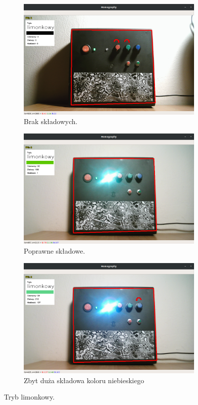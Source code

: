 \documentclass[12pt,twoside,polish]{article}
\begin{document}
\begin{figure}[]
	\begin{subfigure}[b]{0.5\textwidth}
		\includegraphics[width=\textwidth]{lim2}
		\caption{Brak składowych.}
	\end{subfigure}
	\begin{subfigure}[b]{0.5\textwidth}
		\includegraphics[width=\textwidth]{lim3}
		\caption{Poprawne składowe.}
	\end{subfigure}
	\begin{subfigure}[b]{0.5\textwidth}
		\includegraphics[width=\textwidth]{lim4}
		\caption{Zbyt duża składowa koloru niebieskiego}
	\end{subfigure}
	\caption{Tryb limonkowy.}
	\label{lim}
\end{figure}
\end{document}
